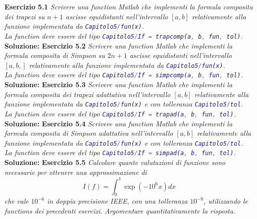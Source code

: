 \begin{flushleft}
\textbf{Esercizio 5.1} \textit{Scrivere una function Matlab che implementi la formula composita dei trapezi su \(n+1\) ascisse equidistanti nell'intervallo \([a, b]\) relativamente alla funzione implementata da \lstinline[language=Matlab]{Capitolo5/fun(x)}.\\La function deve essere del tipo \lstinline[language=Matlab]{Capitolo5/If = trapcomp(a, b, fun, tol)}.}\\
\textbf{Soluzione: }
\bigskip
\textbf{Esercizio 5.2} \textit{Scrivere una function Matlab che implementi la formula composita di Simpson su \(2n+1\) ascisse equidistanti nell'intervallo \([a, b,]\) relativamente alla funzione implementata da \lstinline[language=Matlab]{Capitolo5/fun(x)}.\\La function deve essere del tipo \lstinline[language=Matlab]{Capitolo5/If = simpcomp(a, b, fun, tol)}.}\\
\textbf{Soluzione: }
\bigskip
\textbf{Esercizio 5.3} \textit{Scrivere una function Matlab che implementi la formula composita dei trapezi adattativa nell'intervallo \([a, b]\) relativamente alla funzione implementata da \lstinline[language=Matlab]{Capitolo5/fun(x)} e con tolleranza \lstinline[language=Matlab]{Capitolo5/tol}.\\La function deve essere del tipo \lstinline[language=Matlab]{Capitolo5/If = trapad(a, b, fun, tol)}.}\\
\textbf{Soluzione: }
\bigskip
\textbf{Esercizio 5.4} \textit{Scrivere una function Matlab che implementi la formula composita di Simpson adattativa nell'intervallo \([a, b]\) relativamente alla funzione implementata da \lstinline[language=Matlab]{Capitolo5/fun(x)} e con tolleranza \lstinline[language=Matlab]{Capitolo5/tol}.\\La function deve essere del tipo \lstinline[language=Matlab]{Capitolo5/If = simpad(a, b, fun, tol)}.}\\
\textbf{Soluzione: }
\bigskip
\textbf{Esercizio 5.5} \textit{Calcolare quante valutazioni di funzione sono necessarie per ottenere una approssimazione di
\[I(f) = \int_0^1 \exp(-10^6 x) dx \]
che vale $10^{-6}$ in doppia precisione IEEE, con una tolleranza $10^{-9}$, utilizzando le functions dei precedenti esercizi. Argomentare quantitativamente la risposta.}\\

\end{flushleft}
